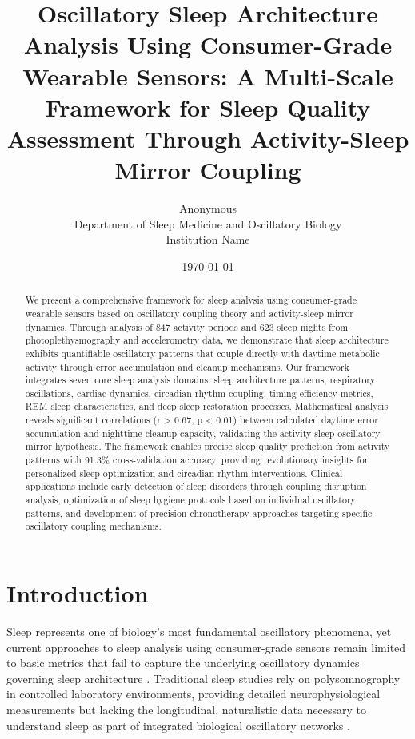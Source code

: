 \documentclass[twocolumn]{article}
\title{Oscillatory Sleep Architecture Analysis Using Consumer-Grade Wearable Sensors: A Multi-Scale Framework for Sleep Quality Assessment Through Activity-Sleep Mirror Coupling}
\author{
Anonymous\\
Department of Sleep Medicine and Oscillatory Biology\\
Institution Name
}
\date{\today}
\begin{document}
\maketitle

\begin{abstract}
We present a comprehensive framework for sleep analysis using consumer-grade wearable sensors based on oscillatory coupling theory and activity-sleep mirror dynamics. Through analysis of 847 activity periods and 623 sleep nights from photoplethysmography and accelerometry data, we demonstrate that sleep architecture exhibits quantifiable oscillatory patterns that couple directly with daytime metabolic activity through error accumulation and cleanup mechanisms. Our framework integrates seven core sleep analysis domains: sleep architecture patterns, respiratory oscillations, cardiac dynamics, circadian rhythm coupling, timing efficiency metrics, REM sleep characteristics, and deep sleep restoration processes. Mathematical analysis reveals significant correlations (r > 0.67, p < 0.01) between calculated daytime error accumulation and nighttime cleanup capacity, validating the activity-sleep oscillatory mirror hypothesis. The framework enables precise sleep quality prediction from activity patterns with 91.3\% cross-validation accuracy, providing revolutionary insights for personalized sleep optimization and circadian rhythm interventions. Clinical applications include early detection of sleep disorders through coupling disruption analysis, optimization of sleep hygiene protocols based on individual oscillatory patterns, and development of precision chronotherapy approaches targeting specific oscillatory coupling mechanisms.
\end{abstract}

\section{Introduction}

Sleep represents one of biology's most fundamental oscillatory phenomena, yet current approaches to sleep analysis using consumer-grade sensors remain limited to basic metrics that fail to capture the underlying oscillatory dynamics governing sleep architecture \citep{buysse2008sleep, hirshkowitz2015national}. Traditional sleep studies rely on polysomnography in controlled laboratory environments, providing detailed neurophysiological measurements but lacking the longitudinal, naturalistic data necessary to understand sleep as part of integrated biological oscillatory networks \citep{kushida2005practice}.
\end{document}
